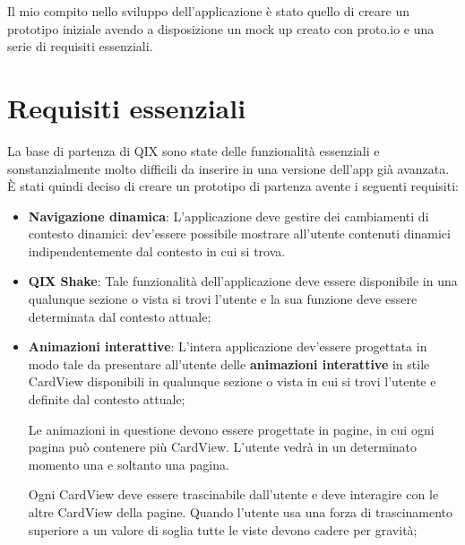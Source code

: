 
Il mio compito nello sviluppo dell'applicazione è stato quello 
di creare un prototipo iniziale avendo a disposizione un mock up creato con
proto.io\cite{protoio} e una serie di requisiti essenziali.

\section{Requisiti essenziali}

La base di partenza di QIX sono state delle funzionalità essenziali e 
sonstanzialmente molto difficili da inserire in una versione dell'app già avanzata.
È stati quindi deciso di creare un prototipo di partenza avente i seguenti requisiti:

\begin{itemize}
    \item {
        \textbf{Navigazione dinamica}: L'applicazione deve gestire dei cambiamenti di contesto
        dinamici: dev'essere possibile mostrare all'utente contenuti dinamici indipendentemente
        dal contesto in cui si trova.
    }
    \item {
        \textbf{QIX Shake}: Tale funzionalità dell'applicazione
        deve essere disponibile in una qualunque sezione o vista si trovi l'utente
        e la sua funzione deve essere determinata dal contesto attuale;
    } 
    \item {
        \textbf{Animazioni interattive}: L'intera applicazione dev'essere progettata in modo tale da presentare all'utente
        delle \textbf{animazioni interattive} in stile CardView\cite{cardview} disponibili in 
        qualunque sezione o vista in cui si trovi l'utente e definite dal contesto attuale;

        Le animazioni in questione devono essere progettate in pagine, in cui ogni pagina può contenere 
        più CardView. L'utente vedrà in un determinato momento una e soltanto una pagina.

        Ogni CardView deve essere trascinabile dall'utente e deve interagire con le altre CardView della pagine. 
        Quando l'utente usa una forza di trascinamento superiore a un valore di soglia tutte le viste devono
        cadere per gravità;
        
}
\end{itemize}
